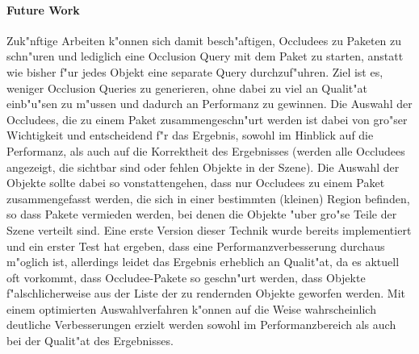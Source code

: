\documentclass[journal]{vgtc}
\begin{document}
\paragraph{Future Work} Zuk"nftige Arbeiten k"onnen sich damit besch"aftigen, Occludees zu Paketen zu schn"uren und lediglich eine Occlusion Query mit dem Paket zu starten, anstatt wie bisher f"ur jedes Objekt eine separate Query durchzuf"uhren. Ziel ist es, weniger Occlusion Queries zu generieren, ohne dabei zu viel an Qualit"at einb"u"sen zu m"ussen und dadurch an Performanz zu gewinnen. Die Auswahl der Occludees, die zu einem Paket zusammengeschn"urt werden ist dabei von gro"ser Wichtigkeit und entscheidend f"r das Ergebnis, sowohl im Hinblick auf die Performanz, als auch auf die Korrektheit des Ergebnisses (werden alle Occludees angezeigt, die sichtbar sind oder fehlen Objekte in der Szene). Die Auswahl der Objekte sollte dabei so vonstattengehen, dass nur Occludees zu einem Paket zusammengefasst werden, die sich in einer bestimmten (kleinen) Region befinden, so dass Pakete vermieden werden, bei denen die Objekte "uber gro"se Teile der Szene verteilt sind. Eine erste Version dieser Technik wurde bereits implementiert und ein erster Test hat ergeben, dass eine Performanzverbesserung durchaus m"oglich ist, allerdings leidet das Ergebnis erheblich an Qualit"at, da es aktuell oft vorkommt, dass Occludee-Pakete so geschn"urt werden, dass Objekte f"alschlicherweise aus der Liste der zu rendernden Objekte geworfen werden. Mit einem optimierten Auswahlverfahren k"onnen auf die Weise wahrscheinlich deutliche Verbesserungen erzielt werden sowohl im Performanzbereich als auch bei der Qualit"at des Ergebnisses. 

 

\end{document}
